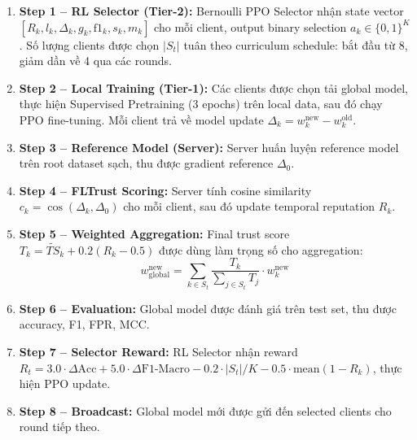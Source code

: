 \documentclass[12pt,a4paper]{article}
\begin{document}
\begin{enumerate}
    \item \textbf{Step 1 -- RL Selector (Tier-2):} Bernoulli PPO Selector nhận state vector $[R_k, l_k, \Delta_k, g_k, \mathrm{f1}_k, s_k, m_k]$ cho mỗi client, output binary selection $a_k \in \{0, 1\}^K$. Số lượng clients được chọn $|S_t|$ tuân theo curriculum schedule: bắt đầu từ 8, giảm dần về 4 qua các rounds.

    \item \textbf{Step 2 -- Local Training (Tier-1):} Các clients được chọn tải global model, thực hiện Supervised Pretraining (3 epochs) trên local data, sau đó chạy PPO fine-tuning. Mỗi client trả về model update $\Delta_k = w_k^{\text{new}} - w_k^{\text{old}}$.

    \item \textbf{Step 3 -- Reference Model (Server):} Server huấn luyện reference model trên root dataset sạch, thu được gradient reference $\Delta_0$.

    \item \textbf{Step 4 -- FLTrust Scoring:} Server tính cosine similarity $c_k = \cos(\Delta_k, \Delta_0)$ cho mỗi client, sau đó update temporal reputation $R_k$.

    \item \textbf{Step 5 -- Weighted Aggregation:} Final trust score $T_k = \tilde{TS}_k + 0.2(R_k - 0.5)$ được dùng làm trọng số cho aggregation:
    \begin{equation}
        w_{\text{global}}^{\text{new}} = \sum_{k \in S_t} \frac{T_k}{\sum_{j \in S_t} T_j} \cdot w_k^{\text{new}} \label{eq:weighted_agg}
    \end{equation}

    \item \textbf{Step 6 -- Evaluation:} Global model được đánh giá trên test set, thu được accuracy, F1, FPR, MCC.

    \item \textbf{Step 7 -- Selector Reward:} RL Selector nhận reward $R_t = 3.0 \cdot \Delta\text{Acc} + 5.0 \cdot \Delta\text{F1-Macro} - 0.2 \cdot |S_t|/K - 0.5 \cdot \text{mean}(1 - R_k)$, thực hiện PPO update.

    \item \textbf{Step 8 -- Broadcast:} Global model mới được gửi đến selected clients cho round tiếp theo.
\end{enumerate}
\end{document}
